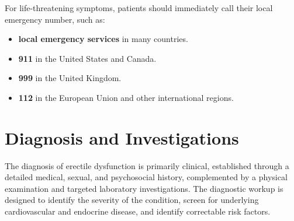 For life-threatening symptoms, patients should immediately call their local emergency number, such as:
\begin{itemize}
    \item \textbf{local emergency services} in many countries.
    \item \textbf{911} in the United States and Canada.
    \item \textbf{999} in the United Kingdom.
    \item \textbf{112} in the European Union and other international regions.
\end{itemize}

\section*{Diagnosis and Investigations}
The diagnosis of erectile dysfunction is primarily clinical, established through a detailed medical, sexual, and psychosocial history, complemented by a physical examination and targeted laboratory investigations. The diagnostic workup is designed to identify the severity of the condition, screen for underlying cardiovascular and endocrine disease, and identify correctable risk factors.

